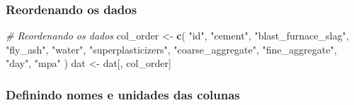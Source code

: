\documentclass[]{article}
\newenvironment{Shaded}{\begin{snugshade}}{\end{snugshade}}
\newcommand{\CommentTok}[1]{\textcolor[rgb]{0.56,0.35,0.01}{\textit{#1}}}
\newcommand{\KeywordTok}[1]{\textcolor[rgb]{0.13,0.29,0.53}{\textbf{#1}}}
\newcommand{\NormalTok}[1]{#1}
\newcommand{\OperatorTok}[1]{\textcolor[rgb]{0.81,0.36,0.00}{\textbf{#1}}}
\newcommand{\StringTok}[1]{\textcolor[rgb]{0.31,0.60,0.02}{#1}}
\begin{document}
\begin{Shaded}
\end{Shaded}

\hypertarget{reordenando-os-dados}{%
\subsubsection{Reordenando os dados}\label{reordenando-os-dados}}

\label{show-reorder-dat}

\begin{Shaded}
\begin{Highlighting}[]
\CommentTok{# Reordenando os dados}
\NormalTok{col_order <-}\StringTok{ }\KeywordTok{c}\NormalTok{(}
  \StringTok{"id"}\NormalTok{,}
  \StringTok{"cement"}\NormalTok{,}
  \StringTok{"blast_furnace_slag"}\NormalTok{,}
  \StringTok{"fly_ash"}\NormalTok{,}
  \StringTok{"water"}\NormalTok{,}
  \StringTok{"superplasticizers"}\NormalTok{,}
  \StringTok{"coarse_aggregate"}\NormalTok{,}
  \StringTok{"fine_aggregate"}\NormalTok{,}
  \StringTok{"day"}\NormalTok{,}
  \StringTok{"mpa"}
\NormalTok{)}
\NormalTok{dat <-}\StringTok{ }\NormalTok{dat[, col_order]}
\end{Highlighting}
\end{Shaded}

\hypertarget{definindo-nomes-e-unidades-das-colunas}{%
\subsubsection{Definindo nomes e unidades das
colunas}\label{definindo-nomes-e-unidades-das-colunas}}

\label{show-col-names-and-units}
\end{document}
